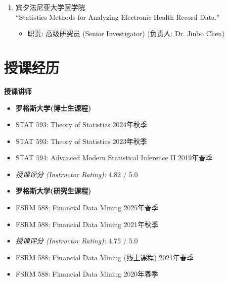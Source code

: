 \documentclass[margin, line]{res}
\begin{document}
\begin{resume}
\begin{enumerate}
            \item 宾夕法尼亚大学医学院\\ ``Statistics Methods for
                Analyzing Electronic Health Record Data."
                \begin{itemize}
                    \item[-] {职责: 高级研究员 (Senior Investigator)} (负责人: Dr. Jinbo Chen)
                \end{itemize}
        \end{enumerate}

		\section{\sc 授课经历}
		{\bf 授课讲师}

        \vspace*{1mm}

        \begin{itemize}
            \item[-] {\bf 罗格斯大学(博士生课程)}

            \item[] STAT 593: Theory of Statistics \hfill{2024年秋季}

            \item[] STAT 593: Theory of Statistics \hfill{2023年秋季}

            \item[] STAT 594: Advanced Modern Statistical Inference II \hfill{2019年春季}

            \item[] {\it 授课评分 (Instructor Rating):} 4.82 / 5.0

            \item[-] {\bf 罗格斯大学(研究生课程)}

            \item[] FSRM 588: Financial Data Mining \hfill{2025年春季}

            \item[] FSRM 588: Financial Data Mining \hfill{2021年秋季}

            \item[] {\it 授课评分 (Instructor Rating):} 4.75 / 5.0

            \item[] FSRM 588: Financial Data Mining (线上课程) \hfill{2021年春季}

            \item[] FSRM 588: Financial Data Mining \hfill{2020年春季}


\end{itemize}
\end{resume}
\end{document}

